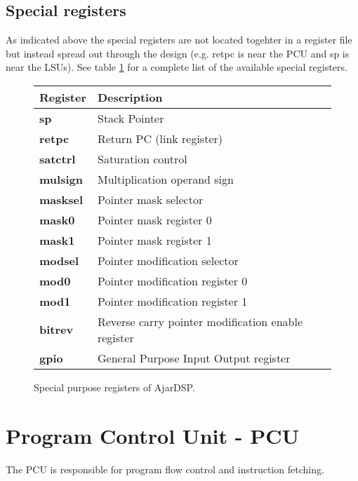 \documentclass[11pt]{book}
\begin{document}
\subsection{Special registers}
As indicated above the special registers are not located togehter in a
register file but instead spread out through the design (e.g. retpc is
near the PCU and sp is near the LSUs). See table
\ref{special-registers} for a complete list of the available special
registers. \break
\begin{figure}
\begin{center}
  \begin{tabular}{ | l | l |}
    \hline
    \cellcolor{lightgray} Register & \cellcolor{lightgray} Description \\ \hline
    \textbf{sp} & Stack Pointer \\ \hline
    \textbf{retpc} & Return PC (link register) \\ \hline
    \textbf{satctrl} & Saturation control \\ \hline
    \textbf{mulsign} & Multiplication operand sign \\ \hline
    \textbf{masksel} & Pointer mask selector \\ \hline
    \textbf{mask0}   & Pointer mask register 0 \\ \hline
    \textbf{mask1}   & Pointer mask register 1 \\ \hline
    \textbf{modsel}  & Pointer modification selector \\ \hline
    \textbf{mod0}    & Pointer modification register 0 \\ \hline
    \textbf{mod1}    & Pointer modification register 1 \\ \hline
    \textbf{bitrev}  & Reverse carry pointer modification enable register \\ \hline
    \textbf{gpio}    & General Purpose Input Output register \\
    \hline
  \end{tabular}
\end{center}
\caption{Special purpose registers of AjarDSP.}
\label{special-registers}
\end{figure}


\section{Program Control Unit - PCU}
The PCU is responsible for program flow control and instruction fetching.
\end{document}
